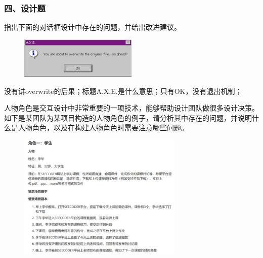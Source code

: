 \subsubsection*{四、设计题}
\setcounter{problemname}{0}

\begin{problem}
指出下面的对话框设计中存在的问题，并给出改进建议。
\begin{figure}[H]
    \vspace{-0.5em}
	\centering
	\includegraphics[width=0.5\textwidth]{1.png}
    \vspace{-1em}
\end{figure}
\end{problem}

\begin{solution}
没有讲overwrite的后果；标题A.X.E.是什么意思；只有OK，没有退出机制；
\end{solution}



\begin{problem}
人物角色是交互设计中非常重要的一项技术，能够帮助设计团队做很多设计决策。如下是某团队为某项目构造的人物角色的例子，请分析其中存在的问题，并说明什么是人物角色，以及在构建人物角色时需要注意哪些问题。
\begin{figure}[H]
    \vspace{-0.5em}
	\centering
	\includegraphics[width=0.7\textwidth]{2.png}
    \vspace{-1em}
\end{figure}
\end{problem}

